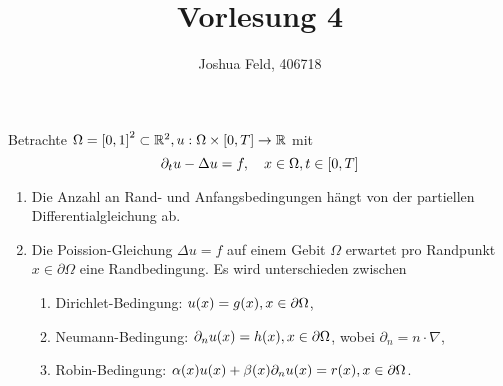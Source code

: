 \documentclass{lecture}
\institute{Applied and Computational Mathematics}
\title{Vorlesung 4}
\author{Joshua Feld, 406718}
\begin{document}
    \maketitle


    \begin{example}
        Betrachte \(\Omega = \brackets*{0, 1}^2 \subset \R^2, u: \Omega \times \brackets*{0, T} \to \R\) mit
        \[
            \partial_t u - \Delta u = f, \quad x \in \Omega, t \in \brackets*{0, T}
        \]
    \end{example}

    \begin{remark}
        \begin{enumerate}
            \item Die Anzahl an Rand- und Anfangsbedingungen hängt von der partiellen Differentialgleichung ab.
            \item Die Poission-Gleichung \(\Delta u = f\) auf einem Gebit \(\Omega\) erwartet pro Randpunkt \(x \in \partial\Omega\) eine Randbedingung.
            Es wird unterschieden zwischen
            \begin{enumerate}
                \item Dirichlet-Bedingung: \(u\parentheses*{x} = g\parentheses*{x}, x \in \partial\Omega\),
                \item Neumann-Bedingung: \(\partial_n u\parentheses*{x} = h\parentheses*{x}, x \in \partial\Omega\), wobei \(\partial_n = n \cdot \nabla\),
                \item Robin-Bedingung: \(\alpha\parentheses*{x}u\parentheses*{x} + \beta\parentheses*{x}\partial_n u\parentheses*{x} = r\parentheses*{x}, x \in \partial\Omega\).
            \end{enumerate}
        \end{enumerate}
    \end{remark}
\end{document}
